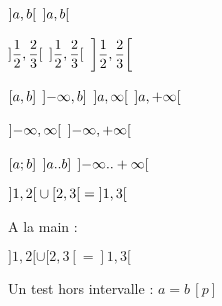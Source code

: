 \documentclass[varwidth, border = 3pt]{standalone}
\begin{document}
$\intervalO{a, b}$
\quad
$\intervalO[big]{a, b}$

$\intervalO{\dfrac{1}{2}, \dfrac{2}{3}}$
\quad
$\intervalO[Big]{\dfrac{1}{2}, \dfrac{2}{3}}$
\quad
$\intervalO*{\dfrac{1}{2}, \dfrac{2}{3}}$

$\intervalC{a, b}$
\quad
$\intervalOC{-\infty, b}$
\quad
$\intervalO{a, \infty}$
\quad
$\intervalO{a, +\infty}$

$\intervalO{-\infty, \infty}$
\quad
$\intervalO{-\infty, +\infty}$

$\intervalC{a ; b}$
\quad
$\intervalOC{a .. b}$
\quad
$\intervalO{-\infty .. +\infty}$

$\intervalO{1, 2} \cup \intervalCO{2, 3} = \intervalO{1, 3}$

A la main :

$]1, 2[ \cup [2, 3[ = ]1, 3[$

Un test hors intervalle : $a = b \, [p]$
\end{document}
